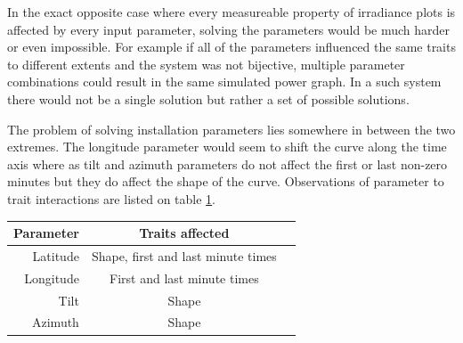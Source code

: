 In the exact opposite case where every measureable property of irradiance plots is affected by every input parameter, solving the parameters would be much harder or even impossible. For example if all of the parameters influenced the same traits to different extents and the system was not bijective, multiple parameter combinations could result in the same simulated power graph. In a such system there would not be a single solution but rather a set of possible solutions.

The problem of solving installation parameters lies somewhere in between the two extremes. The longitude parameter would seem to shift the curve along the time axis where as tilt and azimuth parameters do not affect the first or last non-zero minutes but they do affect the shape of the curve. Observations of parameter to trait interactions are listed on table \ref{table_traits}.



\begin{table}[H]
\centering
\begin{tabular}{r|cc} \hline\hline

 Parameter & Traits affected\\ \hline
 Latitude & Shape, first and last minute times\\
 Longitude & First and last minute times\\
 Tilt & Shape\\
 Azimuth & Shape\\

\hline\hline
\end{tabular}
\label{table_traits}
\end{table}







